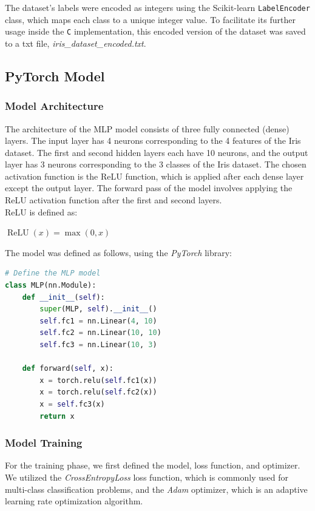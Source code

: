 \documentclass{article}
\begin{document}
The dataset's labels were encoded as integers using the Scikit-learn \texttt{LabelEncoder} class, which maps each class to a unique integer value.
To facilitate its further usage inside the \texttt{C} implementation, this encoded version of the dataset was saved to a txt file, \textit{iris\_dataset\_encoded.txt}.

\subsection{PyTorch Model}
\subsubsection{Model Architecture}
The architecture of the MLP model consists of three fully connected (dense) layers.
The input layer has 4 neurons corresponding to the 4 features of the Iris dataset. 
The first and second hidden layers each have 10 neurons, and the output layer has 3 neurons corresponding to the 3 classes of the Iris dataset.
The chosen activation function is the ReLU function, which is applied after each dense layer except the output layer.
The forward pass of the model involves applying the ReLU activation function after the first and second layers.
\\ReLU is defined as:
\begin{center}
$\operatorname{ReLU}(x) = \max(0, x)$
\end{center}
The model was defined as follows, using the \textit{PyTorch} library:
\begin{lstlisting}[language=Python]
# Define the MLP model
class MLP(nn.Module):
    def __init__(self):
        super(MLP, self).__init__()
        self.fc1 = nn.Linear(4, 10)
        self.fc2 = nn.Linear(10, 10)
        self.fc3 = nn.Linear(10, 3)
    
    def forward(self, x):
        x = torch.relu(self.fc1(x))
        x = torch.relu(self.fc2(x))
        x = self.fc3(x)
        return x
\end{lstlisting}


\subsubsection{Model Training}
For the training phase, we first defined the model, loss function, and optimizer.
We utilized the \textit{CrossEntropyLoss} loss function, which is commonly used for multi-class classification problems, and the \textit{Adam} optimizer, which is an adaptive learning rate optimization algorithm.
\end{document}
